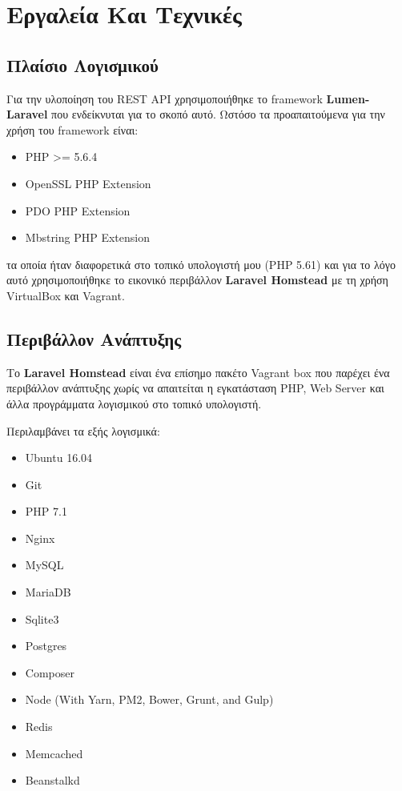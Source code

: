 \section{Εργαλεία Και Τεχνικές}
\subsection{Πλαίσιο Λογισμικού}
Για την υλοποίηση του REST API χρησιμοποιήθηκε το framework\footnotemark{} \textbf{Lumen-Laravel} \cite{lumen-laravel} που ενδείκνυται για το σκοπό αυτό. Ωστόσο τα προαπαιτούμενα για την χρήση του framework είναι:  

\begin{itemize}
\item PHP >= 5.6.4
\item OpenSSL PHP Extension
\item PDO PHP Extension
\item Mbstring PHP Extension
\end{itemize}

τα οποία ήταν διαφορετικά στο τοπικό υπολογιστή μου (PHP 5.61) και για το λόγο αυτό χρησιμοποιήθηκε το εικονικό περιβάλλον \textbf{Laravel Homstead} \cite{laravel-homestead} με τη χρήση VirtualBox\footnotemark{} και Vagrant\footnotemark{}.

\subsection{Περιβάλλον Ανάπτυξης}

Το \textbf{Laravel Homstead}\cite{laravel-homestead} είναι ένα επίσημο πακέτο Vagrant box που παρέχει ένα περιβάλλον ανάπτυξης χωρίς να απαιτείται η εγκατάσταση PHP, Web Server και άλλα προγράμματα λογισμικού στο τοπικό υπολογιστή.

Περιλαμβάνει τα εξής λογισμικά:

\begin{itemize}
\item Ubuntu 16.04
\item Git
\item PHP 7.1
\item Nginx
\item MySQL
\item MariaDB
\item Sqlite3
\item Postgres
\item Composer
\item Node (With Yarn, PM2, Bower, Grunt, and Gulp)
\item Redis
\item Memcached
\item Beanstalkd
\end{itemize}

